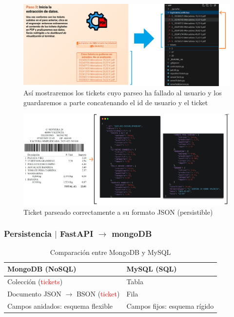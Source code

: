 \documentclass{beamer}
\begin{document}
	\begin{frame}
		
		\begin{figure}
			\centering
			\includegraphics[width=1\linewidth]{imgEspecifiques/mostraErrorsPas4_i_maneig}
			\caption{Así mostraremos los tickets cuyo parseo ha fallado al usuario y los guardaremos a parte concatenando el id de usuario y el ticket}
			\label{fig:mostraerrorspas4imaneig}
		\end{figure}
		
	\end{frame}
	
	
	\begin{frame}

		\begin{figure}
			\centering
			\includegraphics[width=1\linewidth]{imgEspecifiques/ticketFinal}
			\caption{Ticket parseado correctamente a su formato JSON (persistible)}
			\label{fig:ticketFinal}
		\end{figure}
		
	\end{frame}
	
	
	
	\begin{frame}
		\frametitle{Persistencia $|$ FastAPI $\rightarrow$ mongoDB}
		

		\begin{table}[h!]
			\centering
			\begin{tabular}{|l|l|}
				\hline
				\textbf{MongoDB (NoSQL)} & \textbf{MySQL (SQL)} \\
				\hline
				Colección (\textcolor{red}{tickets})  & Tabla  \\
				Documento JSON $\rightarrow$ BSON (\textcolor{red}{ticket}) & Fila \\
				Campos anidados: esquema flexible & Campos fijos: esquema rígido \\
				\hline
			\end{tabular}
			\caption{Comparación entre MongoDB y MySQL}
		\end{table}
		
	\end{frame}
	
\end{document}
